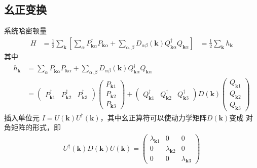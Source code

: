 \subsection{幺正变换}
系统哈密顿量
\begin{equation}
    \begin{aligned} 
    H &= \frac{1}{2}\sum_\mathbf{k}\left[\sum_\alpha  P_{\mathbf{k}\alpha }^\dagger P_{\mathbf{k}\alpha } +  \sum_{\alpha,\beta} D_{\alpha \beta} (\mathbf{k} ) Q_{\mathbf{k}\alpha }^\dagger
    Q_{\mathbf{k}\alpha }\right] 
     &= \frac{1}{2} \sum_\mathbf{k} h_\mathbf{k} 
    \end{aligned} 
\end{equation}
其中
\begin{equation}
    \begin{aligned} 
    h_\mathbf{k}  &= \sum_\alpha  P_{\mathbf{k}\alpha }^\dagger P_{\mathbf{k}\alpha } +  \sum_{\alpha,\beta} D_{\alpha \beta} (\mathbf{k} ) Q_{\mathbf{k}\alpha }^\dagger
    Q_{\mathbf{k}\alpha } \\
    &= \left(\begin{array}{ccc}
          P_{\mathbf{k}1}^\dagger  & P_{\mathbf{k}2}^\dagger  &P_{\mathbf{k}3}^\dagger 
    \end{array}\right) \left(\begin{array}{c}
        P_{\mathbf{k}1} \\
        P_{\mathbf{k}2} \\
        P_{\mathbf{k}3}
          \end{array}\right)+ \left(\begin{array}{ccc}
            Q_{\mathbf{k}1}^\dagger  & Q_{\mathbf{k}2}^\dagger  &Q_{\mathbf{k}3}^\dagger 
      \end{array}\right) D(\mathbf{k} )\left(\begin{array}{c}
          Q_{\mathbf{k}1} \\
          Q_{\mathbf{k}2} \\
          Q_{\mathbf{k}3}
            \end{array}\right)
    \end{aligned}
\end{equation}
插入单位元 $ I = U(\mathbf{k})U^\dagger (\mathbf{k}) $，其中幺正算符可以使动力学矩阵$D(\mathbf{k} )$变成
对角矩阵的形式，即
\begin{equation}
    \begin{aligned} 
        U^\dagger (\mathbf{k})D(\mathbf{k} )U(\mathbf{k}) = \left(\begin{array}{ccc}
            \lambda_{\mathbf{k}1 } &  0 & 0 \\
            0 & \lambda_{\mathbf{k}2 }  & 0 \\
            0 & 0 & \lambda_{\mathbf{k}3 } 
              \end{array}\right)
    \end{aligned} 
\end{equation} 
